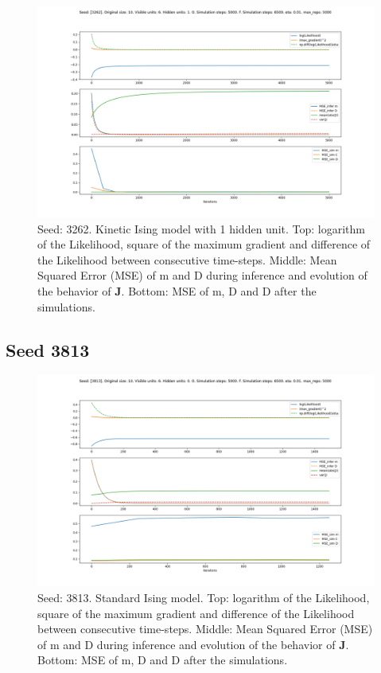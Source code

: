 \documentclass{article}
\def\*#1{\mathbf{#1}}
\begin{document}
\begin{figure}[!htb]
    \centering
    \includegraphics[width=0.8\linewidth]{images/sqrt_size/[3262]_10_6_1_5000_6500_eta001_5000_100.png}
\caption{Seed: 3262. Kinetic Ising model with 1 hidden unit. Top: logarithm of the Likelihood, square of the maximum gradient and difference of the Likelihood between consecutive time-steps. Middle: Mean Squared Error (MSE) of m and D during inference and evolution of the behavior of $\*J$. Bottom: MSE of m, D and D after the simulations.}
\end{figure}



\newpage
\subsection{Seed 3813}

\begin{figure}[!htb]
    \centering
    \includegraphics[width=0.8\linewidth]{images/sqrt_size/[3813]_10_6_0_5000_6500_eta001_5000_100.png}
\caption{Seed: 3813. Standard Ising model. Top: logarithm of the Likelihood, square of the maximum gradient and difference of the Likelihood between consecutive time-steps. Middle: Mean Squared Error (MSE) of m and D during inference and evolution of the behavior of $\*J$. Bottom: MSE of m, D and D after the simulations.}
\end{figure}
\end{document}
